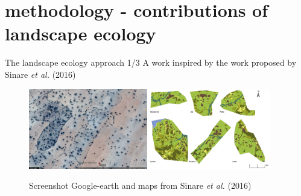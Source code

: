 \documentclass[newPxFont]{beamer}
\begin{document}
\section{methodology - contributions of landscape ecology}

\begin{frame}[c]{The landscape ecology approach 1/3}
\vspace{-1cm}
A work inspired by the work proposed by Sinare \textit{et al.} (2016)
\begin{figure}
	\centering
	\includegraphics[height = 3.5cm]{img/ggearth}
  \includegraphics[height = 3.5cm]{img/Sinare_et_al2016}
  \caption{\small{Screenshot Google-earth and maps from Sinare \textit{et al.} (2016)}}
\end{figure}
\end{frame}

\end{document}
